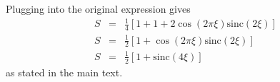 Plugging into the original expression gives\begin{eqnarray*}
S & = & \frac{1}{4}\left[1+1+2\cos(2\pi\xi)\textrm{sinc}(2\xi)\right]\\
S & = & \frac{1}{2}\left[1+\cos(2\pi\xi)\textrm{sinc}(2\xi)\right]\\
S & = & \frac{1}{2}\left[1+\textrm{sinc}(4\xi)\right]\end{eqnarray*}
as stated in the main text.

